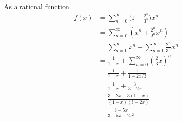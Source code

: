 As a rational function
\begin{align*}
f(x)
&= \sum_{n=0}^\infty \biggl( 1 + \frac{2^n}{3^n}  \biggr) x^n \\
&= \sum_{n=0}^\infty \left( x^n + \frac{2^n}{3^n}  x^n \right) \\
&= \sum_{n=0}^\infty x^n + \sum_{n=0}^\infty \frac{2^n}{3^n}  x^n  \\
&= \frac{1}{1 - x} + \sum_{n=0}^\infty \left( \frac{2}{3} x \right) ^n  \\
&= \frac{1}{1 - x} + \frac{1}{1 - 2x/3} \\
&= \frac{1}{1 - x} + \frac{3}{3 - 2x} \\
&= \frac{3 - 2x + 3(1 - x)}{(1 - x)(3 - 2x)} \\
&= \frac{6 - 5x}{3 - 5x + 2x^2} \\
\end{align*}
